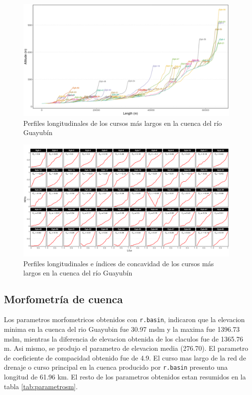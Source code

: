 \documentclass[11pt,]{article}
\begin{document}
\begin{figure}
\centering
\includegraphics[width=1.00000\textwidth]{perfiles longitudinales.png}
\caption{Perfiles longitudinales de los cursos más largos en la cuenca
del río Guayubín\label{plongitudinal}}
\end{figure}

\begin{figure}
\centering
\includegraphics[width=1.00000\textwidth]{Indices de concavidad.png}
\caption{Perfiles longitudinales e índices de concavidad de los cursos
más largos en la cuenca del río Guayubín\label{indicec}}
\end{figure}

\subsection{Morfometría de cuenca}\label{morfometruxeda-de-cuenca}

Los parametros morfometricos obtenidos con \texttt{r.basin}, indicaron
que la elevacion minima en la cuenca del rio Guayubin fue 30.97 mslm y
la maxima fue 1396.73 mslm, mientras la diferencia de elevacion obtenida
de los claculos fue de 1365.76 m. Asi mismo, se produjo el parametro de
elevacion media (276.70). El parametro de coeficiente de compacidad
obtenido fue de 4.9. El curso mas largo de la red de drenaje o curso
principal en la cuenca producido por \texttt{r.basin} presento una
longitud de 61.96 km. El resto de los parametros obtenidos estan
resumidos en la tabla \ref{tab:parametrosm}.
\end{document}
